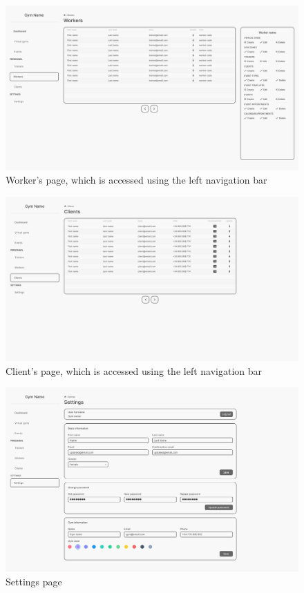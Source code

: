\documentclass[a4paper, 12pt, oneside]{book}
\begin{document}
\begin{figure}[H]
	\centering
	\includegraphics[width=\textwidth]{assets/ui/workers.png}
	\caption{Worker's page, which is accessed using the left navigation bar}
\end{figure}
\begin{figure}[H]
	\centering
	\includegraphics[width=\textwidth]{assets/ui/clients.png}
	\caption{Client's page, which is accessed using the left navigation bar}
\end{figure}
\begin{figure}[H]
	\centering
	\includegraphics[width=\textwidth]{assets/ui/settings-owner.png}
	\caption{Settings page}
\end{figure}
\end{document}

